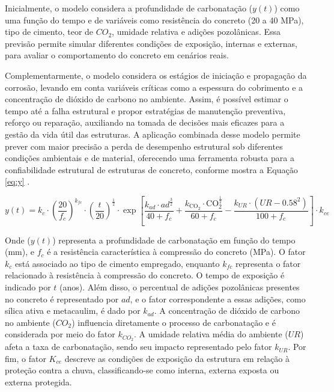 Inicialmente, o modelo considera a profundidade de carbonatação ($y(t)$) como uma função do tempo e de variáveis como resistência do concreto (20 a 40 MPa), tipo de cimento, teor de $CO_2$, umidade relativa e adições pozolânicas. Essa previsão permite simular diferentes condições de exposição, internas e externas, para avaliar o comportamento do concreto em cenários reais. 

Complementarmente, o modelo considera os estágios de iniciação e propagação da corrosão, levando em conta variáveis críticas como a espessura do cobrimento e a concentração de dióxido de carbono
no ambiente. Assim, é possível estimar o tempo até a falha estrutural e propor estratégias de manutenção preventiva, reforço ou reparação, auxiliando na tomada de decisões mais eficazes para a gestão da vida útil das estruturas. A aplicação combinada desse modelo permite prever com maior precisão a perda de desempenho estrutural sob diferentes condições ambientais e de material, oferecendo uma ferramenta robusta para a confiabilidade estrutural de estruturas de concreto, conforme mostra a Equação \eqref{eq:y} \cite{possan2010, possan_co2_2016}.

\begin{equation}\label{eq:y}
y(t) = k_c \cdot \left( \frac{20}{f_c} \right)^{k_{fc}} \cdot \left( \frac{t}{20} \right)^{\frac{1}{2}} \cdot \exp \left[ \frac{k_{ad} \cdot ad^{\frac{3}{2}}}{40 + f_c} + \frac{k_{\text{CO}_2} \cdot \text{CO}_2^{\frac{1}{2}}}{60 + f_c} - \frac{k_{UR} \cdot (UR - 0.58^2)}{100 + f_c} \right] \cdot k_{ce}
\end{equation}

Onde ($y(t)$) representa a profundidade de carbonatação em função do tempo (mm), e $f_c$ é a resistência característica à compressão do concreto (MPa). O fator $k_c$ está associado ao tipo de cimento empregado, enquanto $k_{fc}$ representa o fator relacionado à resistência à compressão do concreto. O tempo de exposição é indicado por $t$ (anos). Além disso, o percentual de adições pozolânicas presentes no concreto é representado por $ad$, e o fator correspondente a essas adições, como sílica ativa e metacaulim, é dado por $k_{ad}$. A concentração de dióxido de carbono no ambiente ($CO_2$) influencia diretamente o processo de carbonatação e é considerada por meio do fator $k_{CO_2}$. A umidade relativa média do ambiente ($UR$) afeta a taxa de carbonatação, sendo seu impacto representado pelo fator $k_{UR}$. Por fim, o fator $K_{ce}$ descreve as condições de exposição da estrutura em relação à proteção contra a chuva, classificando-se como interna, externa exposta ou externa protegida.

